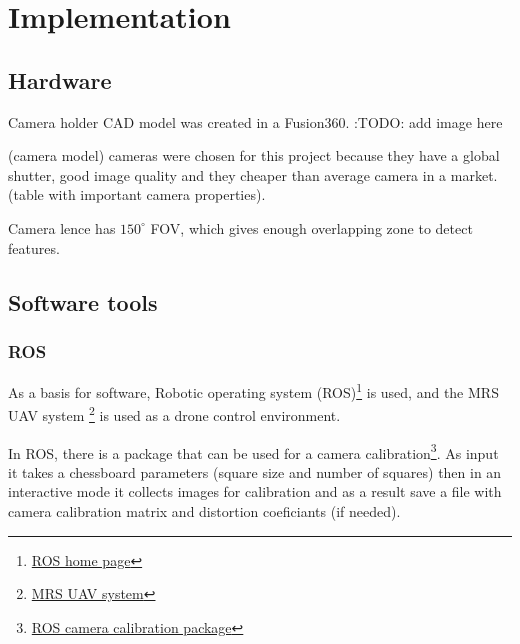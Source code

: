 \chapter{Implementation}
\label{chapter:implementation}


\section{Hardware}
Camera holder CAD model was created in a Fusion360. 
:TODO: add image here

(camera model) cameras were chosen for this project because they have a global shutter, good image quality and they cheaper than average camera in a market.
(table with important camera properties).

Camera lence has $150^\circ$ FOV, which gives enough overlapping zone to detect features.

\section{Software tools}

\subsection{ROS}
As a basis for software, Robotic operating system (ROS)\footnote{\href{https://www.ros.org/}{ROS home page}} is used, and the MRS UAV system \cite{Baca2021} \footnote{\href{https://github.com/ctu-mrs/mrs_uav_system}{MRS UAV system}} is used as a drone control environment.

In ROS, there is a package that can be used for a camera calibration\footnote{\href{http://wiki.ros.org/camera_calibration}{ROS camera calibration package}}. As input it takes a chessboard parameters (square size and number of squares) then in an interactive mode it collects images for calibration and as a result save a file with camera calibration matrix and distortion coeficiants (if needed).





